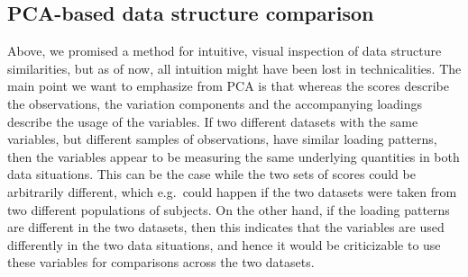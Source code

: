 \documentclass[titlepage,11pt,twoside]{article}
\DeclareMathOperator*{\V}{V}
\newcommand{\argmax}{\text{argmax}}
\begin{document}
%

\subsection{PCA-based data structure comparison}
Above, we promised a method for intuitive, visual inspection of data structure similarities, but as of now, all intuition might have been lost in technicalities. The main point we want to emphasize from PCA is that whereas the scores describe the observations, the variation components and the accompanying loadings describe the usage of the variables. If two different datasets with the same variables, but different samples of observations, have similar loading patterns, then the variables appear to be measuring the same underlying quantities in both data situations. This can be the case while the two sets of scores could be arbitrarily different, which e.g.\ could happen if the two datasets were taken from two different populations of subjects. On the other hand, if the loading patterns are different in the two datasets, then this indicates that the variables are used differently in the two data situations, and hence it would be criticizable to use these variables for comparisons across the two datasets.

\end{document}
